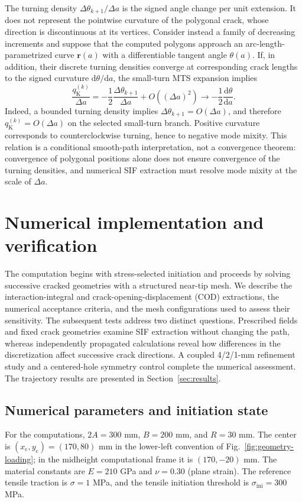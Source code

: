 \documentclass[11pt]{article}
\newcommand{\dd}{\mathrm{d}}
\newcommand{\PlateAMM}{300}
\newcommand{\HoleCxMM}{170}
\newcommand{\HoleCyMM}{-20}
\newcommand{\HoleRMM}{30}
\begin{document}
The turning density $\Delta\theta_{k+1}/\Delta a$ is the signed
angle change per unit extension. It does not represent the
pointwise curvature of the polygonal crack, whose direction is
discontinuous at its vertices. Consider instead a family of
decreasing increments and suppose that the computed polygons
approach an arc-length-parametrized curve $\bm r(a)$ with a
differentiable tangent angle $\theta(a)$. If, in addition, their
discrete turning densities converge at corresponding crack lengths
to the signed curvature $\dd\theta/\dd a$, the small-turn
MTS expansion implies
\begin{equation}
 \frac{q_{\mathrm{K}}^{(k)}}{\Delta a}
 =-\frac12\frac{\Delta\theta_{k+1}}{\Delta a}
  +O((\Delta a)^2)
 \longrightarrow-\frac12\frac{\dd\theta}{\dd a}.
 \label{eq:curvature-mts}
\end{equation}
Indeed, a bounded turning density implies
$\Delta\theta_{k+1}=O(\Delta a)$, and therefore
$q_{\mathrm{K}}^{(k)}=O(\Delta a)$ on the selected small-turn
branch. Positive curvature corresponds to counterclockwise
turning, hence to negative mode mixity. This relation is a
conditional smooth-path interpretation, not a convergence
theorem: convergence of polygonal positions alone does not ensure
convergence of the turning densities, and numerical SIF extraction
must resolve mode mixity at the scale of $\Delta a$.

\section{Numerical implementation and verification}
\label{sec:numerics}
The computation begins with stress-selected initiation and proceeds by
solving successive cracked geometries with a structured near-tip mesh.
We describe the interaction-integral and crack-opening-displacement
(COD) extractions, the numerical acceptance criteria, and the
mesh configurations used to assess their sensitivity. The subsequent
tests address two distinct questions. Prescribed fields and fixed
crack geometries examine SIF extraction without changing the path,
whereas independently propagated calculations reveal how differences
in the discretization affect successive crack directions. A coupled
4/2/1-mm refinement study and a centered-hole symmetry control
complete the numerical assessment. The trajectory results are
presented in Section~\ref{sec:results}.

\subsection{Numerical parameters and initiation state}
\label{sec:numerical-parameters}
For the computations, $2A=\PlateAMM$ mm, $B=200$ mm, and
$R=\HoleRMM$ mm. The center is $(x_{\mathrm{c}},y_{\mathrm{c}})=(170,80)$ mm in the
lower-left convention of Fig.~\ref{fig:geometry-loading}; in the
midheight computational frame it is
$(\HoleCxMM,\HoleCyMM)$ mm. The material constants are
$E=210$ GPa and $\nu=0.30$ (plane strain). The reference
tensile traction is $\sigma=1$ MPa, and the tensile initiation
threshold is $\sigma_{\mathrm{ini}}=300$ MPa.
\end{document}
